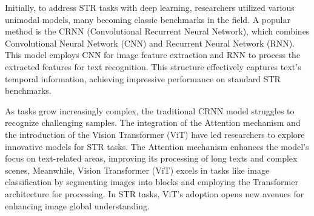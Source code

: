\documentclass[runningheads]{llncs}
\begin{document}
Initially, to address STR tasks with deep learning, researchers utilized various unimodal models, many becoming classic benchmarks in the field.	A popular method is the CRNN\cite{shi2016end_CRNN} (Convolutional Recurrent Neural Network), which combines Convolutional Neural Network (CNN) and Recurrent Neural Network (RNN).	This model employs CNN for image feature extraction and RNN to process the extracted features for text recognition.	This structure effectively captures text's temporal information, achieving impressive performance on standard STR benchmarks.	

As tasks grow increasingly complex, the traditional CRNN model struggles to recognize challenging samples.	The integration of the Attention\cite{vaswani2017attention} mechanism and the introduction of the Vision Transformer (ViT)\cite{dosovitskiy2020image_vit} have led researchers to explore innovative models for STR tasks.	The Attention mechanism enhances the model's focus on text-related areas, improving its processing of long texts and complex scenes,	Meanwhile, Vision Transformer (ViT) excels in tasks like image classification by segmenting images into blocks and employing the Transformer architecture for processing.	In STR tasks, ViT's adoption opens new avenues for enhancing image global understanding.	
\end{document}
